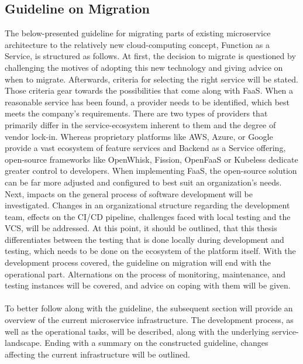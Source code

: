 \documentclass[a4paper,twoside,11pt, pagesize]{scrartcl}
\begin{document}
\begin{spacing}{1.2}
\newpage




\section{Guideline on Migration}
The below-presented guideline for migrating parts of existing microservice architecture to the relatively new cloud-computing concept, Function as a Service, is structured as follows. At first, the decision to migrate is questioned by challenging the motives of adopting this new technology and giving advice on when to migrate. Afterwards, criteria for selecting the right service will be stated. Those criteria gear towards the possibilities that come along with FaaS. When a reasonable service has been found, a provider needs to be identified, which best meets the company's requirements. There are two types of providers that primarily differ in the service-ecosystem inherent to them and the degree of vendor lock-in. Whereas proprietary platforms like AWS, Azure, or Google provide a vast ecosystem of feature services and Backend as a Service offering, open-source frameworks like OpenWhisk, Fission, OpenFaaS or Kubeless dedicate greater control to developers. When implementing FaaS, the open-source solution can be far more adjusted and configured to best suit an organization's needs. Next, impacts on the general process of software development will be investigated. Changes in an organizational structure regarding the development team, effects on the CI/CD pipeline, challenges faced with local testing and the VCS, will be addressed. At this point, it should be outlined, that this thesis differentiates between the testing that is done locally during development and testing, which needs to be done on the ecosystem of the platform itself. With the development process covered, the guideline on migration will end with the operational part. Alternations on the process of monitoring, maintenance, and testing instances will be covered, and advice on coping with them will be given.\\\\ To better follow along with the guideline, the subsequent section will provide an overview of the current microservice infrastructure. The development process, as well as the operational tasks, will be described, along with the underlying service-landscape. Ending with a summary on the constructed guideline, changes affecting the current infrastructure will be outlined.

\end{spacing}
\end{document}
